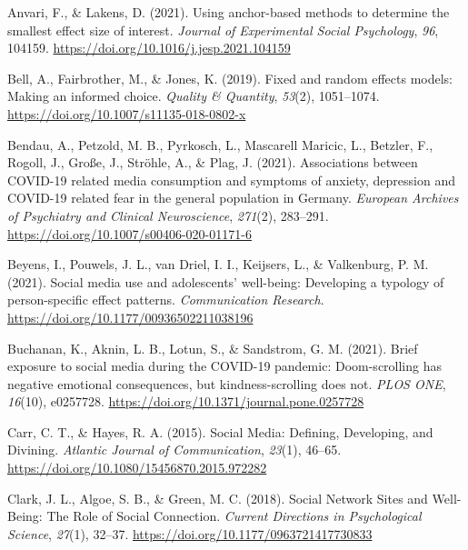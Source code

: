 \documentclass[
  man,mask,floatsintext]{apa7}
\newlength{\cslhangindent}
\newenvironment{CSLReferences}[2] %
 {\begin{list}{}{%
  \setlength{\itemindent}{0pt}
  \setlength{\leftmargin}{0pt}
  \setlength{\parsep}{0pt}
  \ifodd #1
   \setlength{\leftmargin}{\cslhangindent}
   \setlength{\itemindent}{-1\cslhangindent}
  \fi
  \setlength{\itemsep}{#2\baselineskip}}}
 {\end{list}}
\begin{document}
\label{refs}
\begin{CSLReferences}{1}{0}
Anvari, F., \& Lakens, D. (2021). Using anchor-based methods to determine the smallest effect size of interest. \emph{Journal of Experimental Social Psychology}, \emph{96}, 104159. \url{https://doi.org/10.1016/j.jesp.2021.104159}

Bell, A., Fairbrother, M., \& Jones, K. (2019). Fixed and random effects models: Making an informed choice. \emph{Quality \& Quantity}, \emph{53}(2), 1051--1074. \url{https://doi.org/10.1007/s11135-018-0802-x}

Bendau, A., Petzold, M. B., Pyrkosch, L., Mascarell Maricic, L., Betzler, F., Rogoll, J., Große, J., Ströhle, A., \& Plag, J. (2021). Associations between {COVID-19} related media consumption and symptoms of anxiety, depression and {COVID-19} related fear in the general population in {Germany}. \emph{European Archives of Psychiatry and Clinical Neuroscience}, \emph{271}(2), 283--291. \url{https://doi.org/10.1007/s00406-020-01171-6}

Beyens, I., Pouwels, J. L., van Driel, I. I., Keijsers, L., \& Valkenburg, P. M. (2021). Social media use and adolescents' well-being: {Developing} a typology of person-specific effect patterns. \emph{Communication Research}. \url{https://doi.org/10.1177/00936502211038196}

Buchanan, K., Aknin, L. B., Lotun, S., \& Sandstrom, G. M. (2021). Brief exposure to social media during the {COVID-19} pandemic: {Doom-scrolling} has negative emotional consequences, but kindness-scrolling does not. \emph{PLOS ONE}, \emph{16}(10), e0257728. \url{https://doi.org/10.1371/journal.pone.0257728}

Carr, C. T., \& Hayes, R. A. (2015). Social {Media}: {Defining}, {Developing}, and {Divining}. \emph{Atlantic Journal of Communication}, \emph{23}(1), 46--65. \url{https://doi.org/10.1080/15456870.2015.972282}

Clark, J. L., Algoe, S. B., \& Green, M. C. (2018). Social {Network Sites} and {Well-Being}: {The Role} of {Social Connection}. \emph{Current Directions in Psychological Science}, \emph{27}(1), 32--37. \url{https://doi.org/10.1177/0963721417730833}


\end{CSLReferences}
\end{document}
